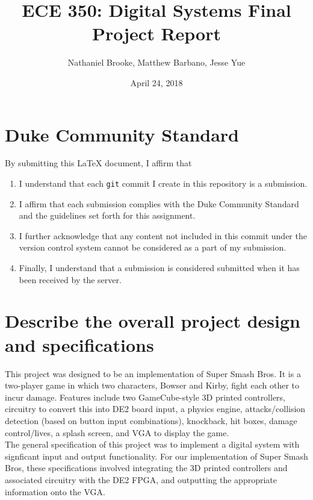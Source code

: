 \documentclass[12pt]{article} %
\begin{document}
\title{ECE 350: Digital Systems Final Project Report}
\author{Nathaniel Brooke, Matthew Barbano, Jesse Yue} %
\date{April 24, 2018} %
\maketitle

\section*{Duke Community Standard}

By submitting this \LaTeX{} document, I affirm that
\begin{enumerate}
    \item I understand that each \texttt{git} commit I create in this repository is a submission.
    \item I affirm that each submission complies with the Duke Community Standard and the guidelines set forth for this assignment.
    \item I further acknowledge that any content not included in this commit under the version control system cannot be considered as a part of my submission.
    \item Finally, I understand that a submission is considered submitted when it has been received by the server.
\end{enumerate}

\section{Describe the overall project design and specifications}
This project was designed to be an implementation of Super Smash Bros. It is a two-player game in which two characters, Bowser and Kirby, fight each other to incur damage. Features include two GameCube-style 3D printed controllers, circuitry to convert this into DE2 board input, a physics engine, attacks/collision detection (based on button input combinations), knockback, hit boxes, damage control/lives, a splash screen, and VGA to display the game.\\

The general specification of this project was to implement a digital system with signficant input and output functionality. For our implementation of Super Smash Bros, these specifications involved integrating the 3D printed controllers and associated circuitry with the DE2 FPGA, and outputting the appropriate information onto the VGA.\\
\end{document}
